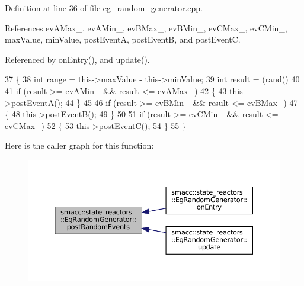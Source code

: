 Definition at line 36 of file eg\+\_\+random\+\_\+generator.\+cpp.



References ev\+A\+Max\+\_\+, ev\+A\+Min\+\_\+, ev\+B\+Max\+\_\+, ev\+B\+Min\+\_\+, ev\+C\+Max\+\_\+, ev\+C\+Min\+\_\+, max\+Value, min\+Value, post\+EventA, post\+EventB, and post\+EventC.



Referenced by on\+Entry(), and update().


\begin{DoxyCode}
37         \{
38             \textcolor{keywordtype}{int} range = this->\hyperlink{classsmacc_1_1state__reactors_1_1EgRandomGenerator_ae023e8a9bd96b3ee065b8a505dd9ab75}{maxValue} - this->\hyperlink{classsmacc_1_1state__reactors_1_1EgRandomGenerator_a0c18129d12648f6d291227b51c379e06}{minValue};
39             \textcolor{keywordtype}{int} result = (rand() %
40 
41             \textcolor{keywordflow}{if} (result >= \hyperlink{classsmacc_1_1state__reactors_1_1EgRandomGenerator_ae8a5afb09e3c5c9aa8e3c5a7a5796338}{evAMin\_} && result <= \hyperlink{classsmacc_1_1state__reactors_1_1EgRandomGenerator_a3a86743f2abe30bb0f413dfc5ab4da96}{evAMax\_})
42             \{
43                 this->\hyperlink{classsmacc_1_1state__reactors_1_1EgRandomGenerator_ab8052ff063ec83c70bce16e22d93adf6}{postEventA}();
44             \}
45 
46             \textcolor{keywordflow}{if} (result >= \hyperlink{classsmacc_1_1state__reactors_1_1EgRandomGenerator_a11da3ad59bcc4c60e7a4d9b9c88005fa}{evBMin\_} && result <= \hyperlink{classsmacc_1_1state__reactors_1_1EgRandomGenerator_a601edeb6cb9b6fc5bf1db173216a550f}{evBMax\_})
47             \{
48                 this->\hyperlink{classsmacc_1_1state__reactors_1_1EgRandomGenerator_abece688b6929dfafeeda21a09ec8efd0}{postEventB}();
49             \}
50 
51             \textcolor{keywordflow}{if} (result >= \hyperlink{classsmacc_1_1state__reactors_1_1EgRandomGenerator_a2b12392b07d0361c72386c9e9cc77695}{evCMin\_} && result <= \hyperlink{classsmacc_1_1state__reactors_1_1EgRandomGenerator_a29c801a671adb7edf7753b1f85bf1a12}{evCMax\_})
52             \{
53                 this->\hyperlink{classsmacc_1_1state__reactors_1_1EgRandomGenerator_acdbf47a22c657f091381c514752940c1}{postEventC}();
54             \}
55         \}
\end{DoxyCode}
Here is the caller graph for this function\+:
\nopagebreak
\begin{figure}[H]
\begin{center}
\leavevmode
\includegraphics[width=350pt]{classsmacc_1_1state__reactors_1_1EgRandomGenerator_ab570c2d1a3e70adb8cfacfcd9000715e_icgraph}
\end{center}
\end{figure}
